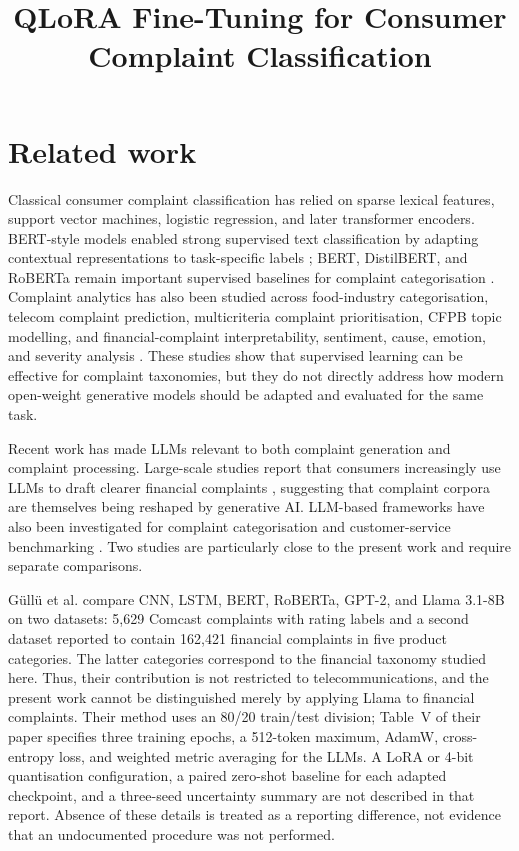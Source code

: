 \documentclass{elektr}
\title{QLoRA Fine-Tuning for Consumer Complaint Classification}
\author[Manuscript]{
\rec{}
\acc{}
\finv{}
}
\begin{document}
\section{Related work}

Classical consumer complaint classification has relied on sparse lexical features, support vector machines, logistic regression, and later transformer encoders. BERT-style models enabled strong supervised text classification by adapting contextual representations to task-specific labels \cite{devlin2019bert}; BERT, DistilBERT, and RoBERTa remain important supervised baselines for complaint categorisation \cite{devlin2019bert,sanh2019distilbert,liu2019roberta,sy2024beyondbert}. Complaint analytics has also been studied across food-industry categorisation, telecom complaint prediction, multicriteria complaint prioritisation, CFPB topic modelling, and financial-complaint interpretability, sentiment, cause, emotion, and severity analysis \cite{bozyigit2022foodcomplaints,gewaly2024telecomcomplaint,vairetti2024complaintpriority,raju2022cfpbtopic,das2024negative}. These studies show that supervised learning can be effective for complaint taxonomies, but they do not directly address how modern open-weight generative models should be adapted and evaluated for the same task.

Recent work has made LLMs relevant to both complaint generation and complaint processing. Large-scale studies report that consumers increasingly use LLMs to draft clearer financial complaints \cite{shin2025adoption,liang2025widespread}, suggesting that complaint corpora are themselves being reshaped by generative AI. LLM-based frameworks have also been investigated for complaint categorisation and customer-service benchmarking \cite{yuan2024framework,li2025teleeval}. Two studies are particularly close to the present work and require separate comparisons.

G\"ull\"u et al. \cite{gullu2025complaintllm} compare CNN, LSTM, BERT, RoBERTa, GPT-2, and Llama 3.1-8B on two datasets: 5,629 Comcast complaints with rating labels and a second dataset reported to contain 162,421 financial complaints in five product categories. The latter categories correspond to the financial taxonomy studied here. Thus, their contribution is not restricted to telecommunications, and the present work cannot be distinguished merely by applying Llama to financial complaints. Their method uses an 80/20 train/test division; Table~V of their paper specifies three training epochs, a 512-token maximum, AdamW, cross-entropy loss, and weighted metric averaging for the LLMs. A LoRA or 4-bit quantisation configuration, a paired zero-shot baseline for each adapted checkpoint, and a three-seed uncertainty summary are not described in that report. Absence of these details is treated as a reporting difference, not evidence that an undocumented procedure was not performed.
\end{document}
